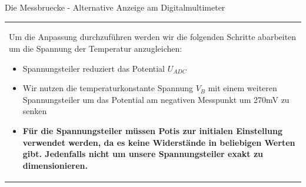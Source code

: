 \begin{frame}[t]{Die Messbruecke - Alternative Anzeige am Digitalmultimeter}
\begin{spacing}{0.9}
\begin{tiny}
\begin{table}[h!]
\begin{tabular}{p{10cm} }
\begin{minipage}{\textwidth}
                        Um die Anpassung durchzuführen werden wir die folgenden Schritte abarbeiten um die Spannung der Temperatur anzugleichen:
                        \begin{itemize}
                            \item Spannungsteiler reduziert das Potential $U_{ADC}$
                            \item Wir nutzen die temperaturkonstante Spannung $V_B$ mit einem weiteren Spannungsteiler um das Potential am negativen Messpunkt um 270mV zu senken
                            \item \textbf{Für die Spannungsteiler müssen Potis zur initialen Einstellung verwendet werden, da es keine Widerstände in beliebigen Werten gibt. Jedenfalls nicht um unsere Spannungsteiler exakt zu dimensionieren.}
                        \end{itemize}
                    \end{minipage}
                \end{tabular}

            \end{table}

        \end{tiny} \end{spacing}

\end{frame}

